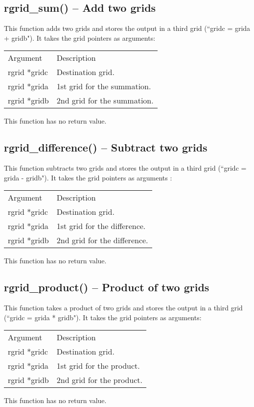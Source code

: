 \documentclass[12pt,letterpaper]{report}
\begin{document}
\subsection{rgrid\_sum() -- Add two grids}

This function adds two grids and stores the output in a third grid (``gridc = grida + gridb"). It takes the grid pointers as arguments:
\begin{longtable}{p{} p{}}
Argument & Description\\
\cline{1-2}
rgrid *gridc & Destination grid.\\
rgrid *grida & 1st grid for the summation.\\
rgrid *gridb & 2nd grid for the summation.\\
\end{longtable}
\noindent
This function has no return value.

\subsection{rgrid\_difference() -- Subtract two grids}

This function subtracts two grids and stores the output in a third grid (``gridc = grida - gridb"). It takes the grid pointers as arguments :
\begin{longtable}{p{} p{}}
Argument & Description\\
\cline{1-2}
rgrid *gridc & Destination grid.\\
rgrid *grida & 1st grid for the difference.\\
rgrid *gridb & 2nd grid for the difference.\\
\end{longtable}
\noindent
This function has no return value.

\subsection{rgrid\_product() -- Product of two grids}

This function takes a product of two grids and stores the output in a third grid (``gridc = grida * gridb"). It takes the grid pointers as arguments:
\begin{longtable}{p{} p{}}
Argument & Description\\
\cline{1-2}
rgrid *gridc & Destination grid.\\
rgrid *grida & 1st grid for the product.\\
rgrid *gridb & 2nd grid for the product.\\
\end{longtable}
\noindent
This function has no return value.
\end{document}
